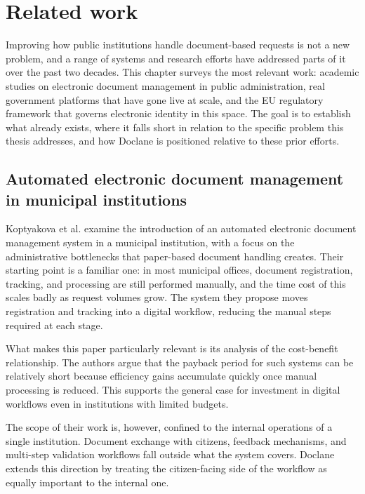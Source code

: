 \chapter{Related work}
\label{chap:ch2}

\par Improving how public institutions handle document-based requests is not a new problem, and a range of systems and research efforts have addressed parts of it over the past two decades. This chapter surveys the most relevant work: academic studies on electronic document management in public administration, real government platforms that have gone live at scale, and the EU regulatory framework that governs electronic identity in this space. The goal is to establish what already exists, where it falls short in relation to the specific problem this thesis addresses, and how Doclane is positioned relative to these prior efforts.


\section{Automated electronic document management in municipal institutions}

\par Koptyakova et al. \cite{koptyakova2019} examine the introduction of an automated electronic document management system in a municipal institution, with a focus on the administrative bottlenecks that paper-based document handling creates. Their starting point is a familiar one: in most municipal offices, document registration, tracking, and processing are still performed manually, and the time cost of this scales badly as request volumes grow. The system they propose moves registration and tracking into a digital workflow, reducing the manual steps required at each stage.

\par What makes this paper particularly relevant is its analysis of the cost-benefit relationship. The authors argue that the payback period for such systems can be relatively short because efficiency gains accumulate quickly once manual processing is reduced. This supports the general case for investment in digital workflows even in institutions with limited budgets.

\par The scope of their work is, however, confined to the internal operations of a single institution. Document exchange with citizens, feedback mechanisms, and multi-step validation workflows fall outside what the system covers. Doclane extends this direction by treating the citizen-facing side of the workflow as equally important to the internal one.

